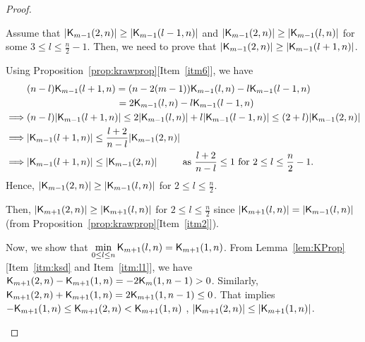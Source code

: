 \documentclass{llncs}
\begin{document}
\begin{proof}
\begin{enumerate}
\begin{enumerate}
Assume that $|\mathsf{K}_{m-1}(2,n)| \geq |\mathsf{K}_{m-1}(l-1,n)|$ and $|\mathsf{K}_{m-1}(2,n)| \geq |\mathsf{K}_{m-1}(l,n)|$ for some $3 \leq l \leq \frac{n}{2}-1$. Then, we need to prove that $|\mathsf{K}_{m-1}(2,n)| \geq |\mathsf{K}_{m-1}(l+1,n)|$.

Using Proposition~\ref{prop:krawprop}[Item~\ref{itm6}], we have 
\begin{align*}
& (n-l)\mathsf{K}_{m-1}(l+1,n) = (n-2(m-1)) \mathsf{K}_{m-1}(l,n) - l\mathsf{K}_{m-1}(l-1,n) \\
& ~~~~~~~~~~~~~~~~~~~~~~~~~~~~ = 2\mathsf{K}_{m-1}(l,n) - l\mathsf{K}_{m-1}(l-1,n) \\
\implies & (n-l)|\mathsf{K}_{m-1}(l+1,n)| \leq 2|\mathsf{K}_{m-1}(l,n)| + l|\mathsf{K}_{m-1}(l-1,n)| \leq (2+l)|\mathsf{K}_{m-1}(2,n)| \\
\implies & |\mathsf{K}_{m-1}(l+1,n)| \leq \frac{l+2}{n-l}|\mathsf{K}_{m-1}(2,n)| \\
\implies & |\mathsf{K}_{m-1}(l+1,n)| \leq |\mathsf{K}_{m-1}(2,n)| ~~~~~~~\text{ as } \frac{l+2}{n-l} \leq 1 \text{ for } 2 \leq l \leq \frac{n}{2}-1.
\end{align*}
Hence, $|\mathsf{K}_{m-1}(2,n)| \geq |\mathsf{K}_{m-1}(l,n)|$ for $2 \leq l \leq \frac{n}{2}$.

Then, $|\mathsf{K}_{m+1}(2,n)| \geq |\mathsf{K}_{m+1}(l,n)|$ for $2 \leq l \leq \frac{n}{2}$ since $|\mathsf{K}_{m+1}(l,n)|=|\mathsf{K}_{m-1}(l,n)|$ (from Proposition~\ref{prop:krawprop}[Item~\ref{itm2}]).

Now, we show that $\min\limits_{0 \leq l \leq n }\mathsf{K}_{m + 1}(l,n) = \mathsf{K}_{m + 1}(1,n)$. 
From Lemma~\ref{lem:KProp}[Item~\ref{itm:ksd} and Item~\ref{itm:l1}], we have $\mathsf{K}_{m+1}(2,n) - \mathsf{K}_{m+1}(1,n) = -2 \mathsf{K}_{m}(1,n-1) > 0$. 
Similarly, $\mathsf{K}_{m+1}(2,n) + \mathsf{K}_{m+1}(1,n) = 2 \mathsf{K}_{m+1}(1,n-1) \leq 0$. That implies $-\mathsf{K}_{m+1}(1,n) \leq \mathsf{K}_{m+1}(2,n) < \mathsf{K}_{m+1}(1,n)$ \ie, $|\mathsf{K}_{m+1}(2,n)| \leq |\mathsf{K}_{m+1}(1,n)|$.


\end{enumerate}
\end{enumerate}
\end{proof}
\end{document}
